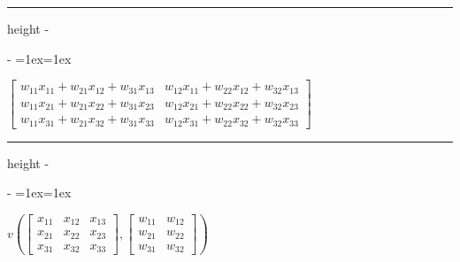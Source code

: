 \documentclass[letterpaper,10pt,english]{sphinxmanual}
\makeatletter
\newenvironment{nbsphinxfancyoutput}{%
    \let\sphinxincludegraphics\nbsphinxincludegraphics
    \nbsphinx@image@maxheight\textheight
    \advance\nbsphinx@image@maxheight -2\fboxsep   %
    \advance\nbsphinx@image@maxheight -2\fboxrule  %
    \advance\nbsphinx@image@maxheight -\baselineskip
\def\nbsphinxfcolorbox{\spx@fcolorbox{nbsphinx-code-border}{white}}%
\def\FrameCommand{\nbsphinxfcolorbox\nbsphinxfancyaddprompt\@empty}%
\def\FirstFrameCommand{\nbsphinxfcolorbox\nbsphinxfancyaddprompt\sphinxVerbatim@Continues}%
\def\MidFrameCommand{\nbsphinxfcolorbox\sphinxVerbatim@Continued\sphinxVerbatim@Continues}%
\def\LastFrameCommand{\nbsphinxfcolorbox\sphinxVerbatim@Continued\@empty}%
\MakeFramed{\advance\hsize-\width\@totalleftmargin\z@\linewidth\hsize\@setminipage}%
\lineskip=1ex\lineskiplimit=1ex\raggedright%
}{\par\unskip\@minipagefalse\endMakeFramed}
\def\nbsphinxfancyaddprompt{\ifvoid\nbsphinxpromptbox\else
    \kern\fboxrule\kern\fboxsep
    \copy\nbsphinxpromptbox
    \kern-\ht\nbsphinxpromptbox\kern-\dp\nbsphinxpromptbox
    \kern-\fboxsep\kern-\fboxrule\nointerlineskip
    \fi}
\newlength\nbsphinxcodecellspacing
\newcommand*{\nbsphinxincludegraphics}[2][]{%
    \gdef\spx@includegraphics@options{#1}%
    \setbox\spx@image@box\hbox{\texttt{[image: \#2]}}%
    \in@false
    \ifdim \wd\spx@image@box>\linewidth
      \g@addto@macro\spx@includegraphics@options{,width=\linewidth}%
      \in@true
    \fi
    \ifdim \ht\spx@image@box>\nbsphinx@image@maxheight
      \g@addto@macro\spx@includegraphics@options{,height=\nbsphinx@image@maxheight}%
      \in@true
    \fi
    \ifin@
      \g@addto@macro\spx@includegraphics@options{,keepaspectratio}%
    \fi
    \setbox\spx@image@box\box\voidb@x %
    \expandafter\includegraphics\expandafter[\spx@includegraphics@options]{#2}%
}%
\makeatother
\begin{document}
\hrule height -\fboxrule\relax
\vspace{\nbsphinxcodecellspacing}

\savebox\nbsphinxpromptbox[0pt][r]{\color{nbsphinxout}\Verb|\strut{[10]:}\,|}

\begin{nbsphinxfancyoutput}
$\displaystyle \left[\begin{matrix}w_{11} x_{11} + w_{21} x_{12} + w_{31} x_{13} & w_{12} x_{11} + w_{22} x_{12} + w_{32} x_{13}\\w_{11} x_{21} + w_{21} x_{22} + w_{31} x_{23} & w_{12} x_{21} + w_{22} x_{22} + w_{32} x_{23}\\w_{11} x_{31} + w_{21} x_{32} + w_{31} x_{33} & w_{12} x_{31} + w_{22} x_{32} + w_{32} x_{33}\end{matrix}\right]$
\end{nbsphinxfancyoutput}

{
\begin{sphinxVerbatim}[commandchars=\\\{\}]
\llap{\color{nbsphinxin}[11]:\,\hspace{\fboxrule}\hspace{\fboxsep}} 
\end{sphinxVerbatim}
}

\hrule height -\fboxrule\relax
\vspace{\nbsphinxcodecellspacing}

\savebox\nbsphinxpromptbox[0pt][r]{\color{nbsphinxout}\Verb|\strut{[11]:}\,|}

\begin{nbsphinxfancyoutput}
$\displaystyle v{\left(\left[\begin{matrix}x_{11} & x_{12} & x_{13}\\x_{21} & x_{22} & x_{23}\\x_{31} & x_{32} & x_{33}\end{matrix}\right],\left[\begin{matrix}w_{11} & w_{12}\\w_{21} & w_{22}\\w_{31} & w_{32}\end{matrix}\right] \right)}$
\end{nbsphinxfancyoutput}
\end{document}

